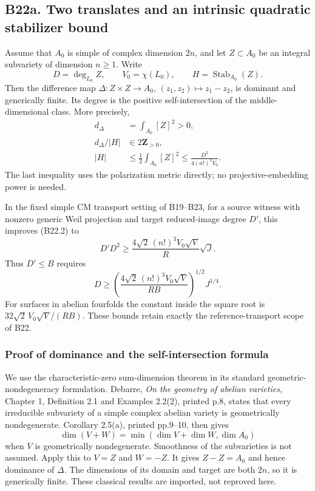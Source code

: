 \subsection{B22a. Two translates and an intrinsic quadratic stabilizer bound}\label{b22a.-two-translates-and-an-intrinsic-quadratic-stabilizer-bound}

Assume that \(A_0\) is simple of complex dimension \(2n\), and let \(Z\subset A_0\) be an integral subvariety of dimension \(n\ge1\). Write \[
 D=\deg_{L_0}Z,\qquad V_0=\chi(L_0),\qquad H=\operatorname{Stab}_{A_0}(Z).
\] Then the difference map \(\Delta:Z\times Z\to A_0\), \((z_1,z_2)\mapsto z_1-z_2\), is dominant and generically finite. Its degree is the positive self-intersection of the middle-dimensional class. More precisely, \[
 \begin{aligned}
 d_\Delta&=\int_{A_0}[Z]^2>0,\\
 d_\Delta/|H|&\in2\mathbf Z_{>0},\\
 |H|&\le\frac12\int_{A_0}[Z]^2
 \le\frac{D^2}{4(n!)^2V_0}.
 \end{aligned}
\tag{B22a.1}
\] The last inequality uses the polarization metric directly; no projective-embedding power is needed.

In the fixed simple CM transport setting of B19--B23, for a source witness with nonzero generic Weil projection and target reduced-image degree \(D'\), this improves (B22.2) to \[
 D'D^2\ge
 \frac{4\sqrt2\,(n!)^3V_0\sqrt V}{R}\sqrt J.
\tag{B22a.2}
\] Thus \(D'\le B\) requires \[
 D\ge
 \left(\frac{4\sqrt2\,(n!)^3V_0\sqrt V}{RB}\right)^{1/2}J^{1/4}.
\tag{B22a.3}
\] For surfaces in abelian fourfolds the constant inside the square root is \(32\sqrt2\,V_0\sqrt V/(RB)\). These bounds retain exactly the reference-transport scope of B22.

\subsubsection{Proof of dominance and the self-intersection formula}\label{proof-of-dominance-and-the-self-intersection-formula}

We use the characteristic-zero sum-dimension theorem in its standard geometric-nondegeneracy formulation. Debarre, \emph{On the geometry of abelian varieties}, Chapter 1, Definition 2.1 and Examples 2.2(2), printed p.8, states that every irreducible subvariety of a simple complex abelian variety is geometrically nondegenerate. Corollary 2.5(a), printed pp.9--10, then gives \[
 \dim(V+W)=\min(\dim V+\dim W,\dim A_0)
\] when \(V\) is geometrically nondegenerate. Smoothness of the subvarieties is not assumed. Apply this to \(V=Z\) and \(W=-Z\). It gives \(Z-Z=A_0\) and hence dominance of \(\Delta\). The dimensions of its domain and target are both \(2n\), so it is generically finite. These classical results are imported, not reproved here.


